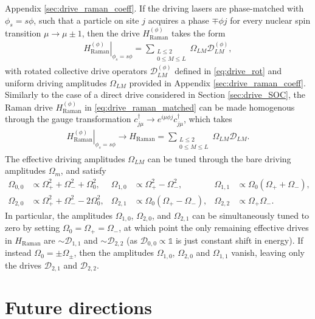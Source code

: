 \documentclass[nofootinbib,notitlepage,11pt]{revtex4-2}
\renewcommand{\t}{\text} %
\newcommand{\p}[1]{\left(#1\right)} %
\newcommand{\1}{\mathds{1}}
\newcommand{\D}{\mathcal{D}}
\begin{document}
Appendix \ref{sec:drive_raman_coeff}.  If the driving lasers are
phase-matched with $\phi_s=s\phi$, such that a particle on site $j$
acquires a phase $\mp\phi j$ for every nuclear spin transition
$\mu\to\mu\pm1$, then the drive $H_{\t{Raman}}^{(\phi)}$ takes the
form
\begin{align}
  \left. H_{\t{Raman}}^{(\phi)} \right|_{\phi_s=s\phi}
  = \sum_{\substack{L\le2\\0\le M\le L}} \Omega_{LM} \D_{LM}^{(\phi)},
  \label{eq:drive_raman_matched}
\end{align}
with rotated collective drive operators $\D_{LM}^{(\phi)}$ defined in
\eqref{eq:drive_rot} and uniform driving amplitudes $\Omega_{LM}$
provided in Appendix \ref{sec:drive_raman_coeff}.  Similarly to the
case of a direct drive considered in Section \ref{sec:drive_SOC}, the
Raman drive $H_{\t{Raman}}^{(\phi)}$ in \eqref{eq:drive_raman_matched}
can be made homogenous through the gauge transformation
$c_{j\mu}^\dag \to e^{i\mu\phi j} c_{j\mu}^\dag$, which takes
\begin{align}
  \left. H_{\t{Raman}}^{(\phi)} \right|_{\phi_s=s\phi}
  \to H_{\t{Raman}}
  = \sum_{\substack{L\le2\\0\le M\le L}} \Omega_{LM} \D_{LM}.
\end{align}
The effective driving amplitudes $\Omega_{LM}$ can be tuned through
the bare driving amplitudes $\Omega_m$, and satisfy
\begin{align}
  \Omega_{0,0} &\propto \Omega_+^2 + \Omega_-^2 + \Omega_0^2,
  &
  \Omega_{1,0} &\propto \Omega_+^2 - \Omega_-^2,
  &
  \Omega_{1,1} &\propto \Omega_0 \p{\Omega_+ + \Omega_-}, \\
  \Omega_{2,0} &\propto \Omega_+^2 + \Omega_-^2 - 2\Omega_0^2,
  &
  \Omega_{2,1} &\propto \Omega_0 \p{\Omega_+ - \Omega_-},
  &
  \Omega_{2,2} &\propto \Omega_+ \Omega_-.
\end{align}
In particular, the amplitudes $\Omega_{1,0}$, $\Omega_{2,0}$, and
$\Omega_{2,1}$ can be simultaneously tuned to zero by setting
$\Omega_0=\Omega_+=\Omega_-$, at which point the only remaining
effective drives in $H_{\t{Raman}}$ are $\sim\D_{1,1}$ and
$\sim\D_{2,2}$ (as $\D_{0,0}\propto\1$ is just constant shift in
energy).  If instead $\Omega_0=\pm\Omega_\pm$, then the amplitudes
$\Omega_{1,0}$, $\Omega_{2,0}$ and $\Omega_{1,1}$ vanish, leaving only
the drives $\D_{2,1}$ and $\D_{2,2}$.

\section{Future directions}
\end{document}

